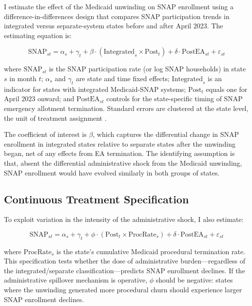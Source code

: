 \documentclass[12pt]{article}
\begin{document}
I estimate the effect of the Medicaid unwinding on SNAP enrollment using a difference-in-differences design that compares SNAP participation trends in integrated versus separate-system states before and after April 2023. The estimating equation is:

\begin{equation}
\text{SNAP}_{st} = \alpha_s + \gamma_t + \beta \cdot (\text{Integrated}_s \times \text{Post}_t) + \delta \cdot \text{PostEA}_{st} + \varepsilon_{st}
\label{eq:did}
\end{equation}

\noindent where $\text{SNAP}_{st}$ is the SNAP participation rate (or log SNAP households) in state $s$ in month $t$; $\alpha_s$ and $\gamma_t$ are state and time fixed effects; $\text{Integrated}_s$ is an indicator for states with integrated Medicaid-SNAP systems; $\text{Post}_t$ equals one for April 2023 onward; and $\text{PostEA}_{st}$ controls for the state-specific timing of SNAP emergency allotment termination. Standard errors are clustered at the state level, the unit of treatment assignment \citep{bertrand2004}.

The coefficient of interest is $\beta$, which captures the differential change in SNAP enrollment in integrated states relative to separate states after the unwinding began, net of any effects from EA termination. The identifying assumption is that, absent the differential administrative shock from the Medicaid unwinding, SNAP enrollment would have evolved similarly in both groups of states.

\subsection{Continuous Treatment Specification}

To exploit variation in the intensity of the administrative shock, I also estimate:

\begin{equation}
\text{SNAP}_{st} = \alpha_s + \gamma_t + \phi \cdot (\text{Post}_t \times \text{ProcRate}_s) + \delta \cdot \text{PostEA}_{st} + \varepsilon_{st}
\label{eq:cont}
\end{equation}

\noindent where $\text{ProcRate}_s$ is the state's cumulative Medicaid procedural termination rate. This specification tests whether the dose of administrative burden---regardless of the integrated/separate classification---predicts SNAP enrollment declines. If the administrative spillover mechanism is operative, $\phi$ should be negative: states where the unwinding generated more procedural churn should experience larger SNAP enrollment declines.
\end{document}

